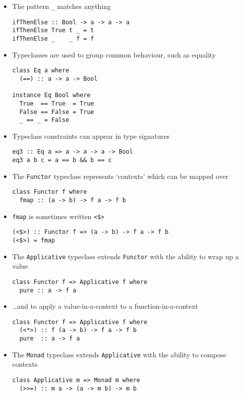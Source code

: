 \begin{itemize}
\item The pattern \verb|_| matches anything
\begin{verbatim}
ifThenElse :: Bool -> a -> a -> a
ifThenElse True t _ = t
ifThenElse _    _ f = f
\end{verbatim}

\item Typeclasses are used to group common behaviour, such as equality
\begin{verbatim}
class Eq a where
  (==) :: a -> a -> Bool

instance Eq Bool where
  True  == True  = True
  False == False = True
  _ == _ = False
\end{verbatim}

\item Typeclass constraints can appear in type signatures
\begin{verbatim}
eq3 :: Eq a => a -> a -> a -> Bool
eq3 a b c = a == b && b == c
\end{verbatim}

\item The \verb|Functor| typeclass represents `contexts' which can be
  mapped over
\begin{verbatim}
class Functor f where
  fmap :: (a -> b) -> f a -> f b
\end{verbatim}

\item \verb|fmap| is sometimes written \verb|<$>|
\begin{verbatim}
(<$>) :: Functor f => (a -> b) -> f a -> f b
(<$>) = fmap
\end{verbatim}

\item The \verb|Applicative| typeclass extends \verb|Functor| with the
  ability to wrap up a value
\begin{verbatim}
class Functor f => Applicative f where
  pure :: a -> f a
\end{verbatim}

\item \ldots{}and to apply a value-in-a-context to a
  function-in-a-context
\begin{verbatim}
class Functor f => Applicative f where
  (<*>) :: f (a -> b) -> f a -> f b
  pure  :: a -> f a
\end{verbatim}

\item The \verb|Monad| typeclass extends \verb|Applicative| with the
  ability to compose contexts
\begin{verbatim}
class Applicative m => Monad m where
  (>>=) :: m a -> (a -> m b) -> m b


\end{verbatim}
\end{itemize}
